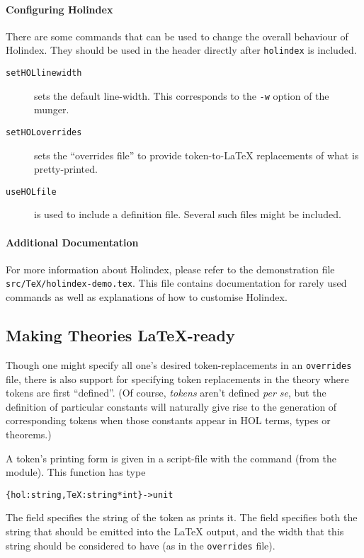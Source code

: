 \paragraph{Configuring Holindex}

There are some commands that can be used to change the overall behaviour
of Holindex. They should be used in the header directly after \texttt{holindex}
is included.
\begin{description}
\item[\texttt{\bs{}setHOLlinewidth}] sets the default line-width. This
   corresponds to the \texttt{-w} option of the munger.

\item[\texttt{\bs{}setHOLoverrides}] sets the ``overrides file'' to provide
token-to-\LaTeX{} replacements of what is pretty-printed.

\item[\texttt{\bs{}useHOLfile}]
is used to include a \HOL{} definition file. Several such files might be
included.
\end{description}


\paragraph{Additional Documentation}
For more information about Holindex, please refer to
the demonstration file \texttt{src/TeX/holindex-demo.tex}. This file contains
documentation for rarely used commands as well as explanations of how to
customise Holindex.


\subsection{Making \HOL{} Theories \LaTeX{}-ready}
\label{sec:holtheories-tex-ready}

Though one might specify all one's desired token-replacements in an \texttt{overrides} file, there is also support for specifying token replacements in the theory where tokens are first ``defined''.
%
(Of course, \emph{tokens} aren't defined \textit{per se}, but the definition of particular constants will naturally give rise to the generation of corresponding tokens when those constants appear in HOL terms, types or theorems.)

A token's printing form is given in a script-file with the  command (from the  module).
%
This function has type
\begin{alltt}
   \{ hol : string, TeX : string * int \} -> unit
\end{alltt}
The  field specifies the string of the token as \HOL{} prints it.
%
The  field specifies both the string that should be emitted into the \LaTeX{} output, and the width that this string should be considered to have (as in the \texttt{overrides} file).

